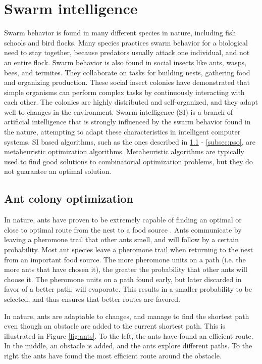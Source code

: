 \section{Swarm intelligence}
\label{sec:swarmIntelligence}
Swarm behavior is found in many different species in nature, including fish schools and bird flocks. Many species practices swarm behavior for a biological need to stay together, because predators usually attack one individual, and not an entire flock. Swarm behavior is also found in social insects like ants, wasps, bees, and termites. They collaborate on tasks for building nests, gathering food and organizing production. These social insect colonies have demonstrated that simple organisms can perform complex tasks by continuously interacting with each other. The colonies are highly distributed and self-organized, and they adapt well to changes in the environment. Swarm intelligence (SI) \citep{beni89} is a branch of artificial intelligence that is strongly influenced by the swarm behavior found in the nature, attempting to adapt these characteristics in intelligent computer systems. SI based algorithms, such as the ones described in \ref{subsec:aco} - \ref{subsec:pso}, are metaheuristic optimization algorithms. Metaheuristic algorithms are typically used to find good solutions to combinatorial optimization problems, but they do not guarantee an optimal solution.  

\subsection{Ant colony optimization}
\label{subsec:aco}
In nature, ants have proven to be extremely capable of finding an optimal or close to optimal route from the nest to a food source \citep{deneubourg90}. Ants communicate by leaving a pheromone trail that other ants smell, and will follow by a certain probability. Most ant species leave a pheromone trail when returning to the nest from an important food source. The more pheromone units on a path (i.e. the more ants that have chosen it), the greater the probability that other ants will choose it. The pheromone units on a path found early, but later discarded in favor of a better path, will evaporate. This results in a smaller probability to be selected, and thus ensures that better routes are favored.

In nature, ants are adaptable to changes, and manage to find the shortest path even though an obstacle are added to the current shortest path. This is illustrated in Figure \ref{fig:ants}. To the left, the ants have found an efficient route. In the middle, an obstacle is added, and the ants explore different paths. To the right the ants have found the most efficient route around the obstacle.

